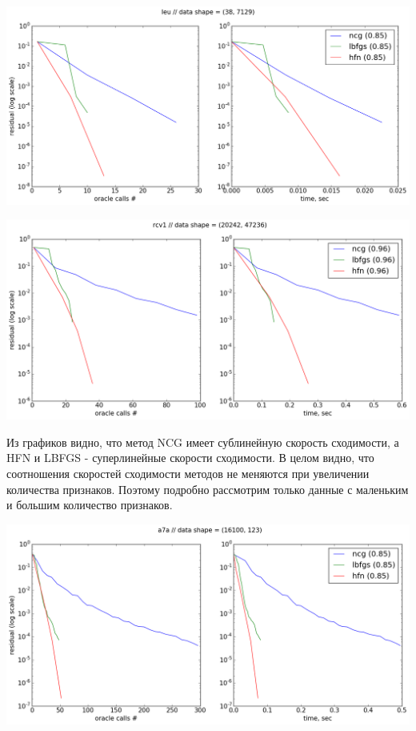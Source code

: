 \documentclass[12pt, a4paper]{article}
\begin{document}
        \begin{center}\includegraphics[width=\picwidth]{leu.png}\end{center}
        \begin{center}\includegraphics[width=\picwidth]{rcv1.png}\end{center}

        Из графиков видно, что метод NCG имеет сублинейную скорость сходимости, а HFN и LBFGS - суперлинейные скорости сходимости. В целом видно, что соотношения скоростей сходимости методов не меняются при увеличении количества признаков. Поэтому подробно рассмотрим только данные с маленьким и большим количество признаков.

        \def \picwidth {17cm}
        \begin{center}\includegraphics[width=\picwidth]{a7a.png}\end{center}
\end{document}
